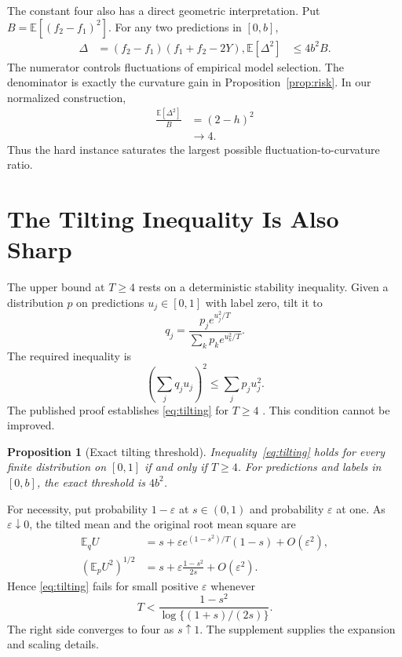\documentclass[twoside]{article}
\newtheorem{proposition}[theorem]{Proposition}
\newcommand{\E}{\mathbb E}
\newcommand{\1}{\mathbf 1}
\begin{document}
The constant four also has a direct geometric interpretation. Put $B=\E[(f_2-f_1)^2]$. For any two predictions in $[0,b]$,
\begin{align}
\Delta&=(f_2-f_1)(f_1+f_2-2Y),\nonumber
\E[\Delta^2]&\leq4b^2B.
\label{eq:variancecurvature}
\end{align}
The numerator controls fluctuations of empirical model selection. The denominator is exactly the curvature gain in Proposition~\ref{prop:risk}. In our normalized construction,
\begin{align*}
\frac{\E[\Delta^2]}{B}
&=(2-h)^2\\
&\longrightarrow4.
\end{align*}
Thus the hard instance saturates the largest possible fluctuation-to-curvature ratio.

\section{The Tilting Inequality Is Also Sharp}

The upper bound at $T\geq4$ rests on a deterministic stability inequality. Given a distribution $p$ on predictions $u_j\in[0,1]$ with label zero, tilt it to \[ q_j=\frac{p_j e^{u_j^2/T}}{\sum_kp_ke^{u_k^2/T}}. \] The required inequality is
\begin{equation}
\left(\sum_jq_ju_j\right)^2\leq\sum_jp_ju_j^2.
\label{eq:tilting}
\end{equation}
The published proof establishes \eqref{eq:tilting} for $T\geq4$ \citep{hogsgaard2026aggregation}. This condition cannot be improved.

\begin{proposition}[Exact tilting threshold]
\label{prop:tilting}
Inequality~\eqref{eq:tilting} holds for every finite distribution on $[0,1]$ if and only if $T\geq4$. For predictions and labels in $[0,b]$, the exact threshold is $4b^2$.
\end{proposition}

For necessity, put probability $1-\varepsilon$ at $s\in(0,1)$ and probability $\varepsilon$ at one. As $\varepsilon\downarrow0$, the tilted mean and the original root mean square are
\begin{align*}
\E_qU&=s+\varepsilon e^{(1-s^2)/T}(1-s)+O(\varepsilon^2),\\
(\E_pU^2)^{1/2}&=s+\varepsilon\frac{1-s^2}{2s}+O(\varepsilon^2).
\end{align*}
Hence \eqref{eq:tilting} fails for small positive $\varepsilon$ whenever \[ T<\frac{1-s^2}{\log\{(1+s)/(2s)\}}. \] The right side converges to four as $s\uparrow1$. The supplement supplies the expansion and scaling details.
\end{document}
